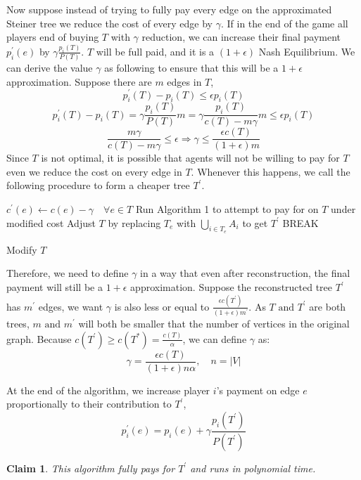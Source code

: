 \documentclass[11pt,psfig,times]{article}
\newtheorem{claim}{Claim}
\begin{document}
	Now suppose instead of trying to fully pay every edge on the approximated Steiner tree we reduce the cost of every edge by $\gamma$. If in the end of the game all players end of buying  $T$ with $\gamma$ reduction, we can increase their final payment $p_i^{'}(e)$ by $\gamma\frac{p_i(T)}{P(T)}$. $T$ will be full paid, and it is a $(1+\epsilon)$ Nash Equilibrium. We can derive the value $\gamma$ as following to ensure that this will be a $1+ \epsilon$ approximation. Suppose there are $m$ edges in $T$,
	\[p_i^{'}(T) - p_i(T) \leq \epsilon p_i(T)\]
	\[p_i^{'}(T) - p_i(T) =  \gamma\frac{p_i(T)}{P(T)}m =  \gamma\frac{p_i(T)}{c(T)-m\gamma}m \leq \epsilon p_i(T)\]
	\[ \frac{m\gamma}{c(T)-m\gamma} \leq \epsilon \Rightarrow \gamma \leq \frac{\epsilon c(T)}{(1+\epsilon)m}\]
	Since $T$ is not optimal, it is possible that agents will not be willing to pay for $T$ even we reduce the cost on every edge in $T$. Whenever this happens, we call the following procedure to form a cheaper tree $T^{'}$. 
	
	
	
		\begin{algorithm}[H]
			\begin{algorithmic}[2]
				\STATE $c^{'}(e) \gets  c(e) -\gamma \quad \forall e \in T$
				\STATE Run Algorithm 1 to attempt to pay for on $T$ under modified cost
				\STATE  Adjust \( T\) by replacing \(T_e\) with  \(\bigcup_{i\in T_e} A_i\) to get \(T^{'}\)
				\STATE BREAK
				\ENDIF
				\ENDWHILE
			\end{algorithmic}
			\caption{Modify $T$ }
		\end{algorithm}
	
	Therefore, we need to define $\gamma$ in a way that even after reconstruction, the final payment will still be a $1+\epsilon$ approximation.  Suppose the reconstructed tree $T^{'}$ has $m^{'}$ edges, we want $\gamma$ is also less or equal to $\frac{\epsilon c(T^{'})}{(1+\epsilon)m^{'}}$. As $T \text{ and } T^{'}$ are both trees, $m \text{ and } m^{'}$ will both be smaller that the number of vertices in the original graph.  Because $c(T^{'}) \geq c(T^*) = \frac{c(T)}{\alpha}$, we can define $\gamma$ as:
	\[\gamma = \frac{\epsilon c(T)}{(1+\epsilon)n\alpha},\quad n = |V|\]
	
		At the end of the algorithm, we increase player $i$'s payment on edge $e$ proportionally to their contribution to $T^{'}$, \[p_i^{'}(e) = p_i(e) + \gamma\frac{p_i(T^{'})}{P(T^{'})}\]
	
		\begin{claim}
			This algorithm fully pays for $T^{'}$ and runs in polynomial time.
		\end{claim}
	
\end{document}
